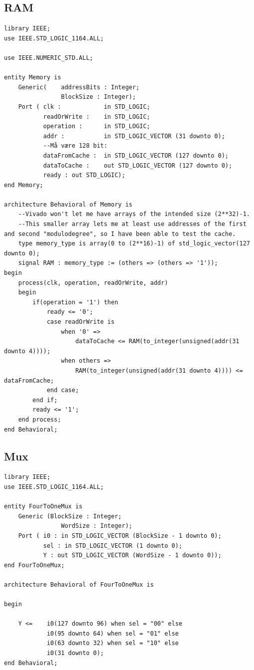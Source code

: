 \documentclass{article}
\begin{document}
\subsection{RAM}
\begin{lstlisting}
library IEEE;
use IEEE.STD_LOGIC_1164.ALL;

use IEEE.NUMERIC_STD.ALL;

entity Memory is
    Generic(    addressBits : Integer;
                BlockSize : Integer); 
    Port ( clk :            in STD_LOGIC;
           readOrWrite :    in STD_LOGIC;
           operation :      in STD_LOGIC;
           addr :           in STD_LOGIC_VECTOR (31 downto 0);
           --Må være 128 bit:
           dataFromCache :  in STD_LOGIC_VECTOR (127 downto 0);
           dataToCache :    out STD_LOGIC_VECTOR (127 downto 0);
           ready : out STD_LOGIC);
end Memory;

architecture Behavioral of Memory is
    --Vivado won't let me have arrays of the intended size (2**32)-1.
    --This smaller array lets me at least use addresses of the first and second "modulodegree", so I have been able to test the cache. 
    type memory_type is array(0 to (2**16)-1) of std_logic_vector(127 downto 0);
    signal RAM : memory_type := (others => (others => '1'));
begin
    process(clk, operation, readOrWrite, addr)
    begin
        if(operation = '1') then
            ready <= '0';
            case readOrWrite is
                when '0' => 
                    dataToCache <= RAM(to_integer(unsigned(addr(31 downto 4))));
                when others =>
                    RAM(to_integer(unsigned(addr(31 downto 4)))) <= dataFromCache;
            end case;
        end if;
        ready <= '1';
    end process; 
end Behavioral;
\end{lstlisting}

\subsection{Mux}
\begin{lstlisting}
library IEEE;
use IEEE.STD_LOGIC_1164.ALL;

entity FourToOneMux is
    Generic (BlockSize : Integer;
                WordSize : Integer);
    Port ( i0 : in STD_LOGIC_VECTOR (BlockSize - 1 downto 0);
           sel : in STD_LOGIC_VECTOR (1 downto 0);
           Y : out STD_LOGIC_VECTOR (WordSize - 1 downto 0));
end FourToOneMux;

architecture Behavioral of FourToOneMux is

begin
    
    Y <=    i0(127 downto 96) when sel = "00" else
            i0(95 downto 64) when sel = "01" else
            i0(63 downto 32) when sel = "10" else
            i0(31 downto 0);
end Behavioral;
\end{lstlisting}
\newpage

\nocite{*}



\end{document}
